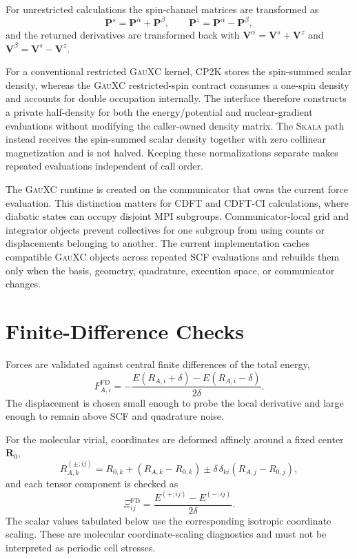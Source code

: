 \documentclass[10pt]{article}
\newcommand{\Skala}{\textsc{Skala}}
\newcommand{\GauXC}{\textsc{GauXC}}
\newcommand{\CPtwoK}{\textsc{CP2K}}
\begin{document}
For unrestricted calculations the spin-channel matrices are transformed as
\begin{equation}
  \mathbf P^{s}=\mathbf P^{\alpha}+\mathbf P^{\beta},
  \qquad
  \mathbf P^{z}=\mathbf P^{\alpha}-\mathbf P^{\beta},
  \label{eq:si_spin_transform}
\end{equation}
and the returned derivatives are transformed back with \(\mathbf V^{\alpha}=\mathbf V^{s}+\mathbf V^{z}\) and \(\mathbf V^{\beta}=\mathbf V^{s}-\mathbf V^{z}\).

For a conventional restricted \GauXC{} kernel, \CPtwoK{} stores the spin-summed scalar density, whereas the \GauXC{} restricted-spin contract consumes a one-spin density and accounts for double occupation internally.  The interface therefore constructs a private half-density for both the energy/potential and nuclear-gradient evaluations without modifying the caller-owned density matrix.  The \Skala{} path instead receives the spin-summed scalar density together with zero collinear magnetization and is not halved.  Keeping these normalizations separate makes repeated evaluations independent of call order.

The \GauXC{} runtime is created on the communicator that owns the current force evaluation.  This distinction matters for CDFT and CDFT-CI calculations, where diabatic states can occupy disjoint MPI subgroups.  Communicator-local grid and integrator objects prevent collectives for one subgroup from using counts or displacements belonging to another.  The current implementation caches compatible \GauXC{} objects across repeated SCF evaluations and rebuilds them only when the basis, geometry, quadrature, execution space, or communicator changes.
\endgroup

\section{{Finite-Difference Checks}}

\begingroup

Forces are validated against central finite differences of the total energy,
\begin{equation}
  F_{A,i}^{\mathrm{FD}}
  =
  -
  \frac{E(R_{A,i}+\delta)-E(R_{A,i}-\delta)}{2\delta}.
  \label{eq:si_force_fd}
\end{equation}
The displacement is chosen small enough to probe the local derivative and large enough to remain above SCF and quadrature noise.

For the molecular virial, coordinates are deformed affinely around a fixed center \(\mathbf R_0\),
\begin{equation}
  R_{A,k}^{(\pm;ij)}
  =
  R_{0,k}
  +
  (R_{A,k}-R_{0,k})
  \pm
  \delta\,\delta_{ki}(R_{A,j}-R_{0,j}),
  \label{eq:si_affine}
\end{equation}
and each tensor component is checked as
\begin{equation}
  \Xi_{ij}^{\mathrm{FD}}
  =
  \frac{E^{(+;ij)}-E^{(-;ij)}}{2\delta}.
  \label{eq:si_virial_tensor_fd}
\end{equation}
The scalar values tabulated below use the corresponding isotropic coordinate scaling.  These are molecular coordinate-scaling diagnostics and must not be interpreted as periodic cell stresses.
\endgroup
\end{document}
